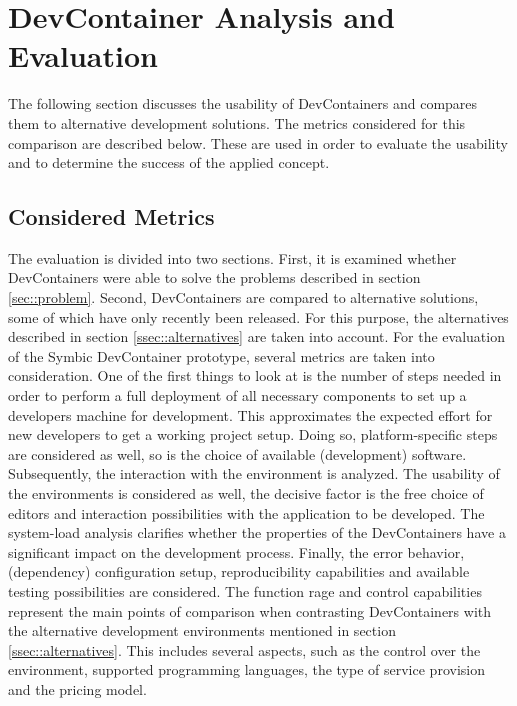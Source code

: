 
\section{DevContainer Analysis and Evaluation}\label{sec::eval}
The following section discusses the usability of DevContainers and compares them to alternative development solutions. The metrics considered for this comparison are described below. These are used in order to evaluate the usability and to determine the success of the applied concept.

    \subsection{Considered Metrics}
    The evaluation is divided into two sections. First, it is examined whether DevContainers were able to solve the problems described in section \ref{sec::problem}. Second, DevContainers are compared to alternative solutions, some of which have only recently been released. For this purpose, the alternatives described in section \ref{ssec::alternatives} are taken into account.\newline
    For the evaluation of the Symbic DevContainer prototype, several metrics are taken into consideration. One of the first things to look at is the number of steps needed in order to perform a full deployment of all necessary components to set up a developers machine for development. This approximates the expected effort for new developers to get a working project setup. Doing so, platform-specific steps are considered as well, so is the choice of available (development) software. Subsequently, the interaction with the environment is analyzed. The usability of the environments is considered as well, the decisive factor is the free choice of editors and interaction possibilities with the application to be developed. The system-load analysis clarifies whether the properties of the DevContainers have a significant impact on the development process. Finally, the error behavior, (dependency) configuration setup, reproducibility capabilities and available testing possibilities are considered. \newline
    The function rage and control capabilities represent the main points of comparison when contrasting DevContainers with the alternative development environments mentioned in section \ref{ssec::alternatives}. This includes several aspects, such as the control over the environment, supported programming languages, the type of service provision and the pricing model.


